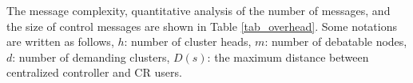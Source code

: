\documentclass[10pt,journal,compsoc]{IEEEtran}
\theoremstyle{mytheoremstyle}
\theoremstyle{mytheoremstyle}
\theoremstyle{mytheoremstyle}
\begin{document}

The message complexity, quantitative analysis of the number of messages, and the size of control messages are shown in Table \ref{tab_overhead}.
Some notations are written as follows,  $h$: number of cluster heads, $m$: number of debatable nodes, $d$: number of demanding clusters, $D(s)$: the maximum distance between centralized controller and CR users.

\end{document}
